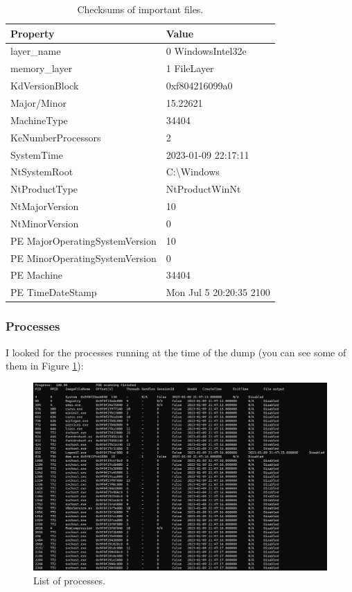 \documentclass[12pt]{article}
\begin{document}
\begin{table}[!ht]
        \centering
        \begin{tabular}{ll}
        \toprule
        \textbf{Property} & \textbf{Value} \\
        \midrule
        layer\_name & 0 WindowsIntel32e \\
        memory\_layer & 1 FileLayer \\
        KdVersionBlock & 0xf804216099a0 \\
        Major/Minor & 15.22621 \\
        MachineType & 34404 \\
        KeNumberProcessors & 2 \\
        SystemTime & 2023-01-09 22:17:11 \\
        NtSystemRoot & C:\textbackslash Windows \\
        NtProductType & NtProductWinNt \\
        NtMajorVersion & 10 \\
        NtMinorVersion & 0 \\
        PE MajorOperatingSystemVersion & 10 \\
        PE MinorOperatingSystemVersion & 0 \\
        PE Machine & 34404 \\
        PE TimeDateStamp & Mon Jul  5 20:20:35 2100 \\
        \bottomrule
        \end{tabular}
        \caption{Checksums of important files.}
        \label{table:info}
\end{table}

\subsubsection{Processes}

I looked for the processes running at the time of the dump (you can see some of them in Figure \ref{fig:bobps}):

\begin{figure}
        \centering
        \includegraphics[width=\textwidth]{images/bobps.png}
        \caption{List of processes.}
        \label{fig:bobps}
\end{figure}
\end{document}
